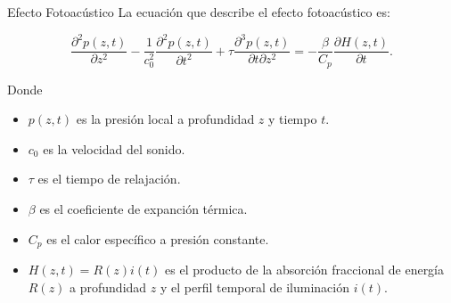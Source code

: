 \documentclass[aspectratio=169,xcolor=dvipsnames]{beamer}
\begin{document}

\begin{frame}{Efecto Fotoacústico}
    La ecuación que describe el efecto fotoacústico es:

    \begin{equation}
        \frac{\partial^2 p(z, t)}{\partial z^2} - \frac{1}{c_0^2} \frac{\partial^2 p(z, t)}{\partial t^2} + \tau \frac{\partial^3 p(z, t)}{\partial t \partial z^2} = -\frac{\beta}{C_p} \frac{\partial H(z, t)}{\partial t}.
    \end{equation}
    \begin{block}{Donde}
        \begin{itemize}
            \item $p(z, t)$ es la presión local a profundidad $z$ y tiempo $t$. 
            \item $c_0$ es la velocidad del sonido.
            \item $\tau$ es el tiempo de relajación.
            \item $\beta$ es el coeficiente de expanción térmica. 
            \item $C_p$ es el calor específico a presión constante. 
            \item $H(z, t) = R(z)i(t)$ es el producto de la absorción fraccional de energía $R(z)$ a profundidad $z$ y el perfil temporal de iluminación $i(t)$.
        \end{itemize}
    \end{block}
\end{frame}




\end{document}
